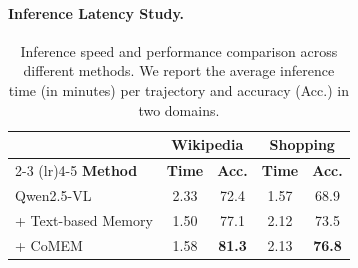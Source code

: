 \documentclass{article} %
\begin{document}
\paragraph{Inference Latency Study.}


\begin{table}
\vspace{-1em}
\centering
\caption{Inference speed and performance comparison across different methods. We report the average inference time (in minutes) per trajectory and accuracy (Acc.) in two domains.}
\vspace{-0.5em}
\small
\begin{tabular}{lcccc}
\toprule
 & \multicolumn{2}{c}{\textbf{Wikipedia}} & \multicolumn{2}{c}{\textbf{Shopping}} \\
\cmidrule(lr){2-3} \cmidrule(lr){4-5}
\textbf{Method} & \textbf{Time} & \textbf{Acc.} & \textbf{Time} & \textbf{Acc.} \\
\midrule
Qwen2.5-VL & 2.33 & 72.4 & 1.57 & 68.9 \\
+ Text-based Memory & 1.50 & 77.1 & 2.12 & 73.5 \\
+ CoMEM & 1.58 & \textbf{81.3} & 2.13 & \textbf{76.8} \\
\bottomrule
\end{tabular}
\label{tab:efficiency}
\vspace{-1em}
\end{table}
\end{document}
